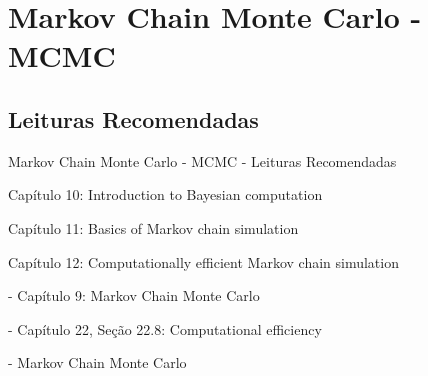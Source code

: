 \section{Markov Chain Monte Carlo - MCMC}

\subsection{Leituras Recomendadas}
\begin{frame}{Markov Chain Monte Carlo - MCMC - Leituras Recomendadas}
    \begin{vfilleditems}
        \item \textcite{gelman2013bayesian}
        \begin{vfilleditems}
            \item Capítulo 10: Introduction to Bayesian computation
            \item Capítulo 11: Basics of Markov chain simulation
            \item Capítulo 12: Computationally efficient Markov chain simulation
        \end{vfilleditems}
        \item \textcite{mcelreath2020statistical} - Capítulo 9: Markov Chain Monte Carlo
        \item \textcite{neal2011mcmc}
        \item \textcite{betancourtConceptualIntroductionHamiltonian2017}
        \item \textcite{gelman2020regression} - Capítulo 22, Seção 22.8: Computational efficiency
        \item \textcite{storopoli2021estatisticabayesianaR} - Markov Chain Monte Carlo
        \item \textcite{chibUnderstandingMetropolisHastingsAlgorithm1995}
        \item \textcite{casellaExplainingGibbsSampler1992}
    \end{vfilleditems}
\end{frame}

